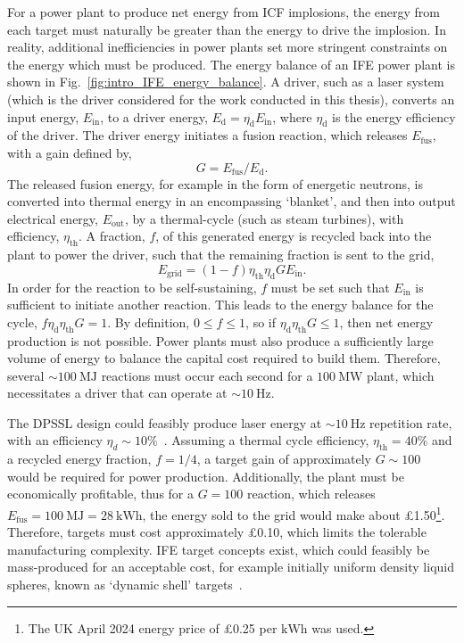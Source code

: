 For a power plant to produce net energy from \ac{ICF} implosions, the energy from each target must naturally be greater than the energy to drive the implosion.
In reality, additional inefficiencies in power plants set more stringent constraints on the energy which must be produced.
The energy balance of an \ac{IFE} power plant is shown in Fig.~\ref{fig:intro_IFE_energy_balance}.
A driver, such as a laser system (which is the driver considered for the work conducted in this thesis), converts an input energy, $E_{\text{in}}$, to a driver energy, $E_{\text{d}} = \eta_{\text{d}}E_{\text{in}}$, where $\eta_{\text{d}}$ is the energy efficiency of the driver.
The driver energy initiates a fusion reaction, which releases $E_{\text{fus}}$, with a gain defined by,
\begin{equation}
    G = E_{\text{fus}}/E_{\text{d}}.
\end{equation}
The released fusion energy, for example in the form of energetic neutrons, is converted into thermal energy in an encompassing `blanket', and then into output electrical energy, $E_\text{out}$, by a thermal-cycle (such as steam turbines), with efficiency, $\eta_{\text{th}}$.
A fraction, $f$, of this generated energy is recycled back into the plant to power the driver, such that the remaining fraction is sent to the grid,
\begin{equation}
    E_{\text{grid}} = (1-f) \eta_{\text{th}} \eta_{\text{d}} G E_{\text{in}}.
\end{equation}
In order for the reaction to be self-sustaining, $f$ must be set such that $E_{\text{in}}$ is sufficient to initiate another reaction.
This leads to the energy balance for the cycle, $f\eta_{\text{d}}\eta_{\text{th}}G=1$.
By definition, $0\leq f \leq 1$, so if $\eta_{\text{d}}\eta_{\text{th}}G\leq 1$, then net energy production is not possible.
Power plants must also produce a sufficiently large volume of energy to balance the capital cost required to build them.
Therefore, several $\sim100\ \text{MJ}$ reactions must occur each second for a $100\ \text{MW}$ plant, which necessitates a driver that can operate at $\sim10\ \text{Hz}$.

The \ac{DPSSL} design could feasibly produce laser energy at $\sim10\ \text{Hz}$ repetition rate, with an efficiency $\eta_d\sim10\%$~\cite{banerjee_dipole_2015,batani_future_2023}.
Assuming a thermal cycle efficiency, $\eta_{\text{th}}=40\%$ and a recycled energy fraction, $f=1/4$, a target gain of approximately $G\sim100$ would be required for power production.
Additionally, the plant must be economically profitable, thus for a $G=100$ reaction, which releases $E_{\text{fus}} = 100\ \text{MJ} = 28\ \text{kWh}$, the energy sold to the grid would make about £1.50\footnote{The UK April 2024 energy price of £0.25 per $\text{kWh}$ was used.}.
Therefore, targets must cost approximately £0.10, which limits the tolerable manufacturing complexity.
\ac{IFE} target concepts exist, which could feasibly be mass-produced for an acceptable cost, for example initially uniform density liquid spheres, known as `dynamic shell' targets~\cite{goncharov_novel_2020,igumenshchev_proofprinciple_2023}.

